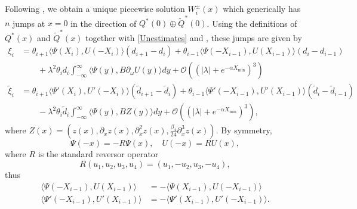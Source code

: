 \documentclass[12pt]{article}
\begin{document}
Following \cite{Manukian,Sandstede1998}, we obtain a unique piecewise solution $W_i^\pm(x)$ which generically has $n$ jumps at $x = 0$ in the direction of $Q^*(0) \oplus \tilde{Q}^*(0)$. Using the definitions of $Q^*(x)$ and $\tilde{Q}^*(x)$ together with \cref{Unestimates} and \cite[(3.19)]{Manukian}, these jumps are given by
\begin{equation}\label{jumpcond1}
\begin{aligned}
\xi_i &= \theta_{i+1} \langle \Psi(X_i), U(-X_i) \rangle (d_{i+1} - d_i) 
+ \theta_{i-1} \langle \Psi(-X_{i-1}), U(X_{i-1}) \rangle (d_i - d_{i-1} )  \\
&\qquad + \lambda^2 \theta_i d_i \int_{-\infty}^\infty \langle \Psi(y), B \partial_\omega U(y) \rangle dy 
+ \mathcal{O}((|\lambda| + e^{-\alpha X_{\min}})^3) \\
\tilde{\xi}_i &= \theta_{i+1} \langle \Psi'(X_i), U'(-X_i) \rangle (\tilde{d}_{i+1} - \tilde{d}_i) 
+ \theta_{i-1} \langle \Psi'(-X_{i-1}), U'(X_{i-1}) \rangle (\tilde{d}_i - \tilde{d}_{i-1}) \\
&\qquad- \lambda^2 \theta_i \tilde{d}_i \int_{-\infty}^\infty \langle \Psi(y), B Z(y) \rangle dy 
+ \mathcal{O}((|\lambda| + e^{-\alpha X_{\min}})^3),
\end{aligned}
\end{equation}
where $Z(x) = (z(x), \partial_x z(x), \partial_x^2 z(x), \frac{\beta_4}{24} \partial_x^3 z(x))$. By symmetry, 
\begin{equation}\label{Rrelation}
\Psi(-x) = -R \Psi(x), \quad U(-x) = R U(x),
\end{equation}
where $R$ is the standard reversor operator 
\[
R(u_1, u_2, u_3, u_4) = (u_1, -u_2, u_3, -u_4),
\] 
thus 
\begin{align*}
\langle \Psi(-X_{i-1}), U(X_{i-1}) \rangle &= -\langle \Psi(X_{i-1}), U(-X_{i-1}) \rangle \\
\langle \Psi'(-X_{i-1}), U'(X_{i-1}) \rangle &= -\langle \Psi'(X_{i-1}), U'(-X_{i-1}) \rangle.
\end{align*} 
\end{document}
